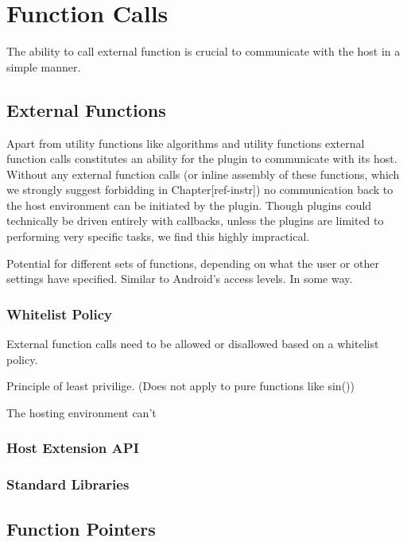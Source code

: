 \chapter {Function Calls}

The ability to call external function is crucial to communicate with the host in
a simple manner.


\section {External Functions}

Apart from utility functions like algorithms and utility functions external
function calls constitutes an ability for the plugin to communicate with its
host. Without any external function calls (or inline assembly of these
functions, which we strongly suggest forbidding in Chapter[ref-instr]) no
communication back to the host environment can be initiated by the plugin.
Though plugins could technically be driven entirely with callbacks, unless the
plugins are limited to performing very specific tasks, we find this highly
impractical.

Potential for different sets of functions, depending on what the user or other
settings have specified. Similar to Android's access levels. In some way.

\subsection {Whitelist Policy}

External function calls need to be allowed or disallowed based on a whitelist
policy.

Principle of least privilige. (Does not apply to pure functions like sin())

The hosting environment can't 

\subsection {Host Extension API}

\subsection {Standard Libraries}


\section {Function Pointers}


